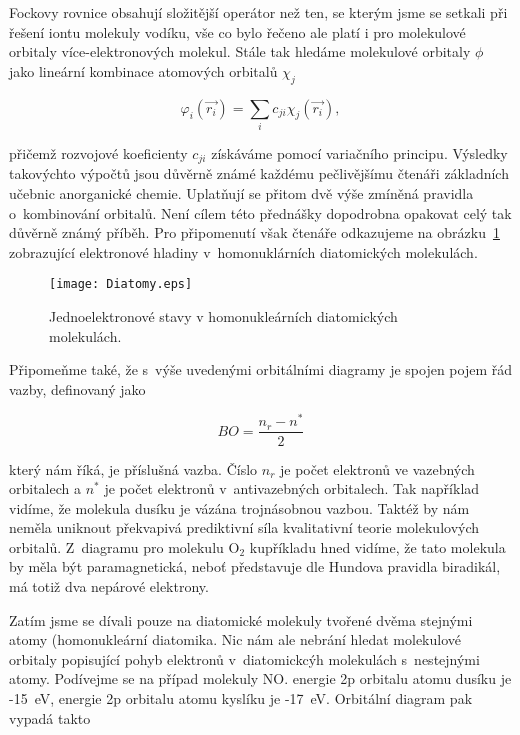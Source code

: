 \noindent Fockovy rovnice obsahují složitější operátor než ten, se kterým jsme se setkali při řešení iontu molekuly vodíku, vše co bylo řečeno ale platí i pro molekulové orbitaly více-elektronových molekul. Stále tak hledáme molekulové orbitaly $\phi$ jako lineární kombinace atomových orbitalů $\chi_j$

\begin{equation}
\varphi_i(\vec{r_i}) = \sum_i c_{ji} \chi_j (\vec{r_i}),
\label{rov:ElStrukt-20}
\end{equation}

\noindent přičemž rozvojové koeficienty $c_{ji}$ získáváme pomocí variačního principu. Výsledky takovýchto výpočtů jsou důvěrně známé každému pečlivějšímu čtenáři základních učebnic anorganické chemie. Uplatňují se přitom dvě výše zmíněná pravidla o~kombinování orbitalů. Není cílem této přednášky dopodrobna opakovat celý tak důvěrně známý příběh. Pro připomenutí však čtenáře odkazujeme na obrázku~\ref{obr:Diatomy} zobrazující elektronové hladiny v~homonuklárních diatomických molekulách.

\begin{figure} [htb]
\centering
\texttt{[image: Diatomy.eps]}
\caption[Diatomické molekuly]{Jednoelektronové stavy v homonukleárních diatomických molekulách.}
\label{obr:Diatomy}
\end{figure}

Připomeňme také, že s~výše uvedenými orbitálními diagramy je spojen pojem řád vazby, definovaný jako

\begin{equation}
BO = \frac{n_r - n^{\ast}}{2}
\label{rov:ElStrukt-21}
\end{equation}

\noindent který nám říká,  je příslušná vazba. Číslo $n_r$ je počet elektronů ve vazebných orbitalech a $n^{\ast}$ je počet elektronů v~antivazebných orbitalech. Tak například vidíme, že molekula dusíku je vázána trojnásobnou vazbou. Taktéž by nám neměla uniknout překvapivá prediktivní síla kvalitativní teorie molekulových orbitalů. Z~diagramu pro molekulu O$_2$ kupříkladu hned vidíme, že tato molekula by měla být paramagnetická, neboť představuje dle Hundova pravidla biradikál, má totiž dva nepárové elektrony.

Zatím jsme se dívali pouze na diatomické molekuly tvořené dvěma stejnými atomy (homonukleární diatomika. Nic nám ale nebrání hledat molekulové orbitaly popisující pohyb elektronů v~diatomickcýh molekulách s~nestejnými atomy. Podívejme se na případ molekuly NO. energie 2p orbitalu atomu dusíku je -15~eV, energie 2p orbitalu atomu kyslíku je -17~eV. Orbitální diagram pak vypadá takto

